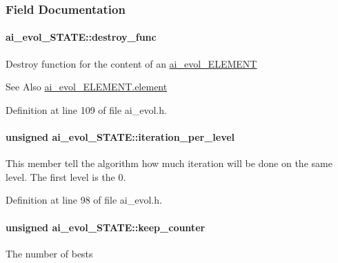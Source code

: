 \subsubsection{Field Documentation}
\hypertarget{a00003_a910eede8e95d587194d5e389f7ea0589}{
\paragraph[{destroy\-\_\-func}]{ ai\-\_\-evol\-\_\-\-S\-T\-A\-T\-E\-::destroy\-\_\-func}}\label{a00003_a910eede8e95d587194d5e389f7ea0589}
Destroy function for the content of an \hyperlink{a00001}{ai\-\_\-evol\-\_\-\-E\-L\-E\-M\-E\-N\-T} \begin{DoxySeeAlso}{See Also}
\hyperlink{a00001_a35a0ba554bf0676ec76c481e1468d835}{ai\-\_\-evol\-\_\-\-E\-L\-E\-M\-E\-N\-T.\-element} 
\end{DoxySeeAlso}


Definition at line 109 of file ai\-\_\-evol.\-h.

\hypertarget{a00003_a09b8e0c8752408132713a22b60f654e4}{
\paragraph[{iteration\-\_\-per\-\_\-level}]{\setlength{\rightskip}{0pt plus 5cm}unsigned ai\-\_\-evol\-\_\-\-S\-T\-A\-T\-E\-::iteration\-\_\-per\-\_\-level}}\label{a00003_a09b8e0c8752408132713a22b60f654e4}
This member tell the algorithm how much iteration will be done on the same level. The first level is the 0. 

Definition at line 98 of file ai\-\_\-evol.\-h.

\hypertarget{a00003_a5583418f98233aa7dc9ce809fc68373f}{
\paragraph[{keep\-\_\-counter}]{\setlength{\rightskip}{0pt plus 5cm}unsigned ai\-\_\-evol\-\_\-\-S\-T\-A\-T\-E\-::keep\-\_\-counter}}\label{a00003_a5583418f98233aa7dc9ce809fc68373f}
The number of bests

